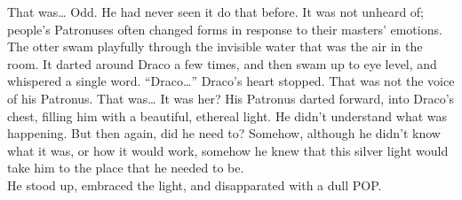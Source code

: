 
That was… Odd. He had never seen it do that before. It was not unheard of; people’s Patronuses often changed forms in response to their masters’ emotions. The otter swam playfully through the invisible water that was the air in the room. It darted around Draco a few times, and then swam up to eye level, and whispered a single word.
\SmallVSpace
“Draco…”
\SmallVSpace
Draco’s heart stopped. That was not the voice of his Patronus. That was… It was her? His Patronus darted forward, into Draco’s chest, filling him with a beautiful, ethereal light. He didn’t understand what was happening. But then again, did he need to? Somehow, although he didn’t know what it was, or how it would work, somehow he knew that this silver light would take him to the place that he needed to be.\\

He stood up, embraced the light, and disapparated with a dull POP.

\simpleline
\SomeVSpace
{}

